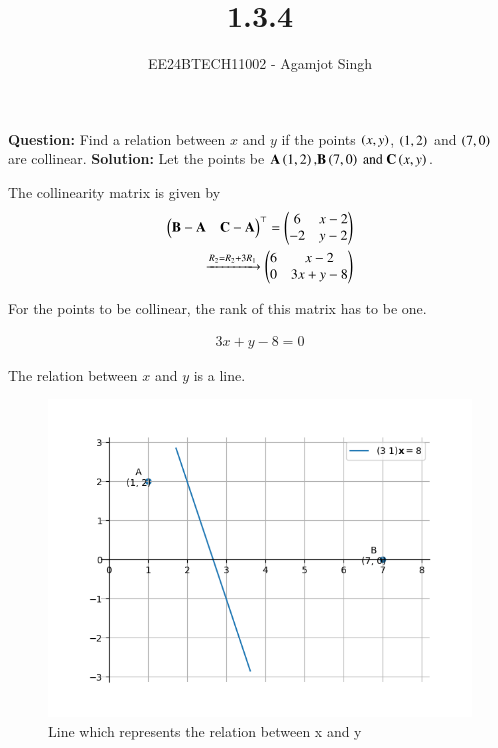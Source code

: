 \documentclass[journal]{IEEEtran}
\begin{document}

\vspace{3cm}

\title{1.3.4}
\author{EE24BTECH11002 - Agamjot Singh
}
{\let\newpage\relax\maketitle}

\renewcommand{\thefigure}{\theenumi}
\renewcommand{\thetable}{\theenumi}
\setlength{\intextsep}{10pt} %

\textbf{Question:}
\newline
Find a relation between $x$ and $y$ if the points $\left(x, y\right)$, $\left(1, 2\right)$ and $\left(7, 0\right)$ are collinear. 
\newline
\textbf{Solution:}
\newline
Let the points be $\mathbf{A}\left(1, 2\right) \text{,} \mathbf{B}\left(7, 0\right) \text{ and } \mathbf{C}\left(x, y\right)$.

The collinearity matrix is given by
\begin{align}
	\begin{pmatrix}\mathbf{B} - \mathbf{A} & \mathbf{C} - \mathbf{A}\end{pmatrix}^\top = \begin{pmatrix}6 & x - 2\\ -2 & y - 2\end{pmatrix}\\ 
													   \xrightarrow{R_2 = R_2 + 3R_1} \begin{pmatrix}6 & x - 2\\0 & 3x + y - 8\end{pmatrix}
\end{align}

For the points to be collinear, the rank of this matrix has to be one.

\begin{align}
	3x + y - 8 = 0
\end{align}

The relation between $x$ and $y$ is a line.

\begin{figure}[h!]
   \centering
   \includegraphics[width=0.7\linewidth]{figs/graph.png}
   \caption{Line which represents the relation between x and y}
\end{figure}
\end{document}
